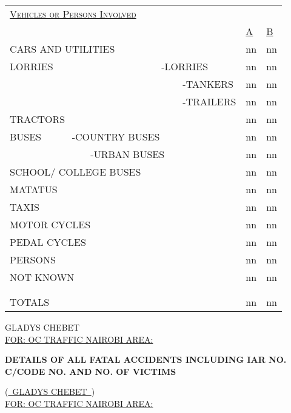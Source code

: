 \documentclass{article}
\begin{document}
\begin{tabular}{lll}
\underline{\textsc{Vehicles or Persons Involved}} & & \\
& \underline{A} & \underline{B} \\
\rule{0pt}{4ex}    
CARS AND UTILITIES & nn & nn \\
\rule{0pt}{4ex}    
LORRIES ~~~~~~~~~~~~~~~~~~~~~ -LORRIES & nn & nn \\
\rule{0pt}{4ex}    
~~~~~~~~~~~~~~~~~~~~~~~~~~~~~~~~~~~ -TANKERS & nn & nn \\
\rule{0pt}{4ex}    
~~~~~~~~~~~~~~~~~~~~~~~~~~~~~~~~~~~ -TRAILERS & nn & nn \\
\rule{0pt}{4ex}    
TRACTORS & nn & nn \\
\rule{0pt}{4ex}    
BUSES ~~~~~ -COUNTRY BUSES & nn & nn \\
\rule{0pt}{4ex}    
~~~~~~~~~~~~~~~~ -URBAN BUSES & nn & nn \\
\rule{0pt}{4ex}    
SCHOOL/ COLLEGE BUSES & nn & nn \\
\rule{0pt}{4ex}    
MATATUS & nn & nn \\
\rule{0pt}{4ex}    
TAXIS & nn & nn \\
\rule{0pt}{4ex}    
MOTOR CYCLES & nn & nn \\
\rule{0pt}{4ex}    
PEDAL CYCLES & nn & nn \\
\rule{0pt}{4ex}    
PERSONS & nn & nn \\
\rule{0pt}{4ex}    
NOT KNOWN & nn & nn \\
 & & \\
 & & \\
TOTALS & nn & nn \\
\hline
\end{tabular}

\bigskip
\bigskip
\bigskip
\bigskip
\bigskip
\bigskip
\bigskip
\bigskip

GLADYS CHEBET \\
\underline{FOR: OC TRAFFIC NAIROBI AREA:}

\newpage

{\bf \normalsize DETAILS OF ALL FATAL ACCIDENTS INCLUDING IAR NO. C/CODE NO. AND NO. OF VICTIMS}

\bigskip
\bigskip
\bigskip


(\underline{~GLADYS CHEBET~}) \\
\bigskip
\underline{FOR: OC TRAFFIC NAIROBI AREA:}
\end{document}
